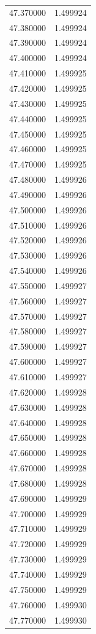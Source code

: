 \begin{tabular}{rr}
47.370000 & 1.499924 \\
47.380000 & 1.499924 \\
47.390000 & 1.499924 \\
47.400000 & 1.499924 \\
47.410000 & 1.499925 \\
47.420000 & 1.499925 \\
47.430000 & 1.499925 \\
47.440000 & 1.499925 \\
47.450000 & 1.499925 \\
47.460000 & 1.499925 \\
47.470000 & 1.499925 \\
47.480000 & 1.499926 \\
47.490000 & 1.499926 \\
47.500000 & 1.499926 \\
47.510000 & 1.499926 \\
47.520000 & 1.499926 \\
47.530000 & 1.499926 \\
47.540000 & 1.499926 \\
47.550000 & 1.499927 \\
47.560000 & 1.499927 \\
47.570000 & 1.499927 \\
47.580000 & 1.499927 \\
47.590000 & 1.499927 \\
47.600000 & 1.499927 \\
47.610000 & 1.499927 \\
47.620000 & 1.499928 \\
47.630000 & 1.499928 \\
47.640000 & 1.499928 \\
47.650000 & 1.499928 \\
47.660000 & 1.499928 \\
47.670000 & 1.499928 \\
47.680000 & 1.499928 \\
47.690000 & 1.499929 \\
47.700000 & 1.499929 \\
47.710000 & 1.499929 \\
47.720000 & 1.499929 \\
47.730000 & 1.499929 \\
47.740000 & 1.499929 \\
47.750000 & 1.499929 \\
47.760000 & 1.499930 \\
47.770000 & 1.499930 \\

\end{tabular}
